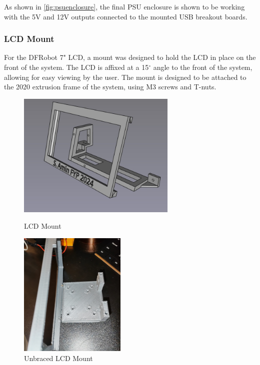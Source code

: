 As shown in \autoref{fig:psuenclosure}, the final PSU enclosure is shown to be working with the 5V and 12V outputs connected to the mounted USB breakout boards.

\subsubsection{LCD Mount}
\label{sec:lcd-mount}
For the DFRobot 7" LCD, a mount was designed to hold the LCD in place on the front of the system. The LCD is affixed at a 15$^{\circ}$ angle to the front of the system, allowing for easy viewing by the user. The mount is designed to be attached to the 2020 extrusion frame of the system, using M3 screws and T-nuts.

\begin{figure}[ht]
    \centering
    \begin{minipage}{0.45\textwidth}
        \centering
        \includegraphics[height=6cm]{imgs/freecad/lcd_mount2.jpg}
        \caption{LCD Mount}
    \end{minipage}\hfill
    \begin{minipage}{0.45\textwidth}
        \centering
        \includegraphics[height=6cm]{imgs/design/unbracedscreen.jpeg}
        \caption{Unbraced LCD Mount}
        \label{fig:brokenlcd}
    \end{minipage}
\end{figure}


